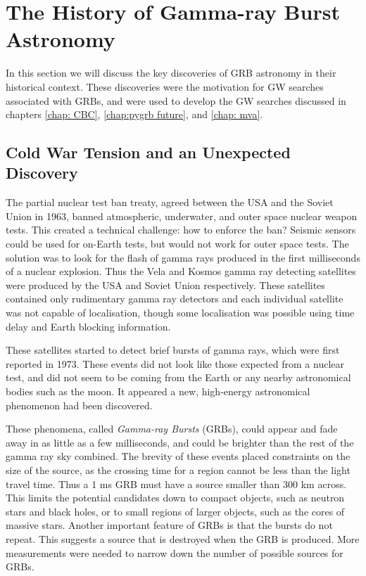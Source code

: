 \documentclass[11pt]{cuthesis}
\begin{document}
\section{The History of Gamma-ray Burst Astronomy} \label{sec:GRB history}
In this section we will discuss the key discoveries of GRB astronomy in their historical context. These discoveries were the motivation for GW searches associated with GRBs, and were used to develop the GW searches discussed in chapters \ref{chap: CBC}, \ref{chap:pygrb future}, and \ref{chap: mva}.  

\subsection{Cold War Tension and an Unexpected Discovery} \label{sec:cold war}
The partial nuclear test ban treaty, agreed between the USA and the Soviet Union in 1963, banned atmospheric, underwater, and outer space nuclear weapon tests. This created a technical challenge: how to enforce the ban? Seismic sensors could be used for on-Earth tests, but would not work for outer space tests. The solution was to look for the flash of gamma rays produced in the first milliseconds of a nuclear explosion. Thus the Vela and Kosmos gamma ray detecting satellites were produced by the USA and Soviet Union respectively. These satellites contained only rudimentary gamma ray detectors and each individual satellite was not capable of localisation, though some localisation was possible using time delay and Earth blocking information.

These satellites started to detect brief bursts of gamma rays, which were first reported in 1973. These events did not look like those expected from a nuclear test, and did not seem to be coming from the Earth or any nearby astronomical bodies such as the moon. It appeared a new, high-energy astronomical phenomenon had been discovered. 

These phenomena, called \textit{Gamma-ray Bursts} (GRBs), could appear and fade away in as little as a few milliseconds, and could be brighter than the rest of the gamma ray sky combined. The brevity of these events placed constraints on the size of the source, as the crossing time for a region cannot be less than the light travel time. Thus a 1 ms GRB must have a source smaller than 300 km across. This limits the potential candidates down to compact objects, such as neutron stars and black holes, or to small regions of larger objects, such as the cores of massive stars. Another important feature of GRBs is that the bursts do not repeat. This suggests a source that is destroyed when the GRB is produced. More measurements were needed to narrow down the number of possible sources for GRBs. 
\end{document}
